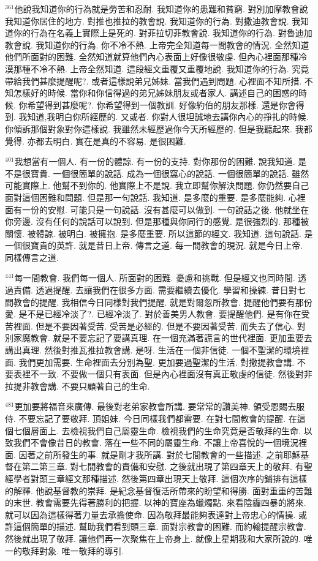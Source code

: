 \documentclass{book}
\begin{document}
$^{361}$他說我知道你的行為就是勞苦和忍耐.
我知道你的患難和貧窮.
對別加摩教會說我知道你居住的地方.
對推也推拉的教會說.
我知道你的行為.
對撒迪教會說.
我知道你的行為在名義上實際上是死的.
對菲拉切菲教會說.
我知道你的行為.
對魯迪加教會說.
我知道你的行為.
你不冷不熱.
上帝完全知道每一間教會的情況.
全然知道他們所面對的困難.
全然知道就算他們內心表面上好像很敬虔.
但內心裡面那種冷漠那種不冷不熱.
上帝全然知道.
這段經文重覆又重覆地說.
我知道你的行為.
究竟帶給我們甚麼提醒呢?.
或者這樣說弟兄姊妹.
當我們遇到問題.
心裡面不知所措.
不知怎樣好的時候.
當你和你信得過的弟兄姊妹朋友或者家人.
講述自己的困惑的時候.
你希望得到甚麼呢?.
你希望得到一個教訓.
好像約伯的朋友那樣.
還是你會得到.
我知道,我明白你所經歷的.
又或者.
你對人很坦誠地去講你內心的掙扎的時候.
你傾訴那個對象對你這樣說.
我雖然未經歷過你今天所經歷的.
但是我聽起來.
我都覺得.
亦都去明白.
實在是真的不容易.
是很困難.

$^{401}$我想當有一個人.
有一份的體諒.
有一份的支持.
對你那份的困難.
說我知道.
是不是很寶貴.
一個很簡單的說話.
成為一個很窩心的說話.
一個很簡單的說話.
雖然可能實際上.
他幫不到你的.
他實際上不是說.
我立即幫你解決問題.
你仍然要自己面對這個困難和問題.
但是那一句說話.
我知道.
是多麼的重要.
是多麼能夠.
心裡面有一份的安慰.
可能只是一句說話.
沒有甚麼可以做到.
一句說話之後.
他就坐在你旁邊.
沒有任何的說話可以說到.
但是那種與你同行的感覺.
是很強烈的.
那種被關懷.
被體諒.
被明白.
被擁抱.
是多麼重要.
所以這節的經文.
我知道.
這句說話.
是一個很寶貴的英許.
就是昔日上帝.
傳言之道.
每一間教會的現況.
就是今日上帝.
同樣傳言之道.

$^{441}$每一間教會.
我們每一個人.
所面對的困難.
憂慮和挑戰.
但是經文也同時間.
透過責備.
透過提醒.
去讓我們在很多方面.
需要繼續去優化.
學習和操練.
昔日對七間教會的提醒.
我相信今日同樣對我們提醒.
就是對爾忽所教會.
提醒他們要有那份愛.
是不是已經冷淡了?.
已經冷淡了.
對於善美男人教會.
要提醒他們.
是有你在受苦裡面.
但是不要因著受苦.
受苦是必經的.
但是不要因著受苦.
而失去了信心.
對別家魔教會.
就是不要忘記了要講真理.
在一個充滿著謊言的世代裡面.
更加重要去講出真理.
然後對推瓦推拉教會講.
是呀.
生活在一個非信徒.
一個不聖潔的環境裡面.
我們更加需要.
生命裡面去分別為聖.
更加要過聖潔的生活.
對撒提教會講.
不要表裡不一致.
不要做一個只有表面.
但是內心裡面沒有真正敬虔的信徒.
然後對非拉提非教會講.
不要只顧著自己的生命.

$^{481}$更加要將福音來廣傳.
最後對老弟家教會所講.
要常常的讚美神.
領受恩賜去服侍.
不要忘記了要敬拜.
頂姐妹.
今日同樣我們都需要.
在對七間教會的提醒.
在這個七個層面上.
去檢視我們自己屬靈生命.
檢視我們的生命究竟是否敬拜的生命.
以致我們不會像昔日的教會.
落在一些不同的屬靈生命.
不讓上帝喜悅的一個境況裡面.
因著之前所發生的事.
就是剛才我所講.
對於七間教會的一些描述.
之前耶穌基督在第二第三章.
對七間教會的責備和安慰.
之後就出現了第四章天上的敬拜.
有聖經學者對頭三章經文那種描述.
然後第四章出現天上敬拜.
這個次序的鋪排有這樣的解釋.
他說基督教的崇拜.
是紀念基督復活所帶來的盼望和得勝.
面對重重的苦難的末世.
教會需要先得著勝利的把握.
以神的寶座為蠟燭點.
來看陰霾四暴的將來.
就可以因為這樣得著力量去承擔使命.
因為敬拜最能夠表達對上帝忠心的情操.
或許這個簡單的描述.
幫助我們看到頭三章.
面對宗教會的困難.
而約翰提醒宗教會.
然後就出現了敬拜.
讓他們再一次聚焦在上帝身上.
就像上星期我和大家所說的.
唯一的敬拜對象.
唯一敬拜的導引.
\end{document}
